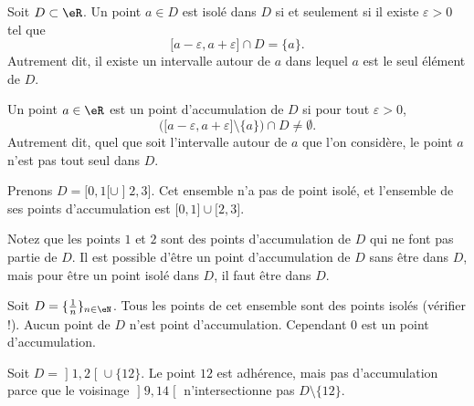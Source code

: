 \begin{lemma}
    Soit $D\subset\eR$. Un point $a\in D$ est isolé dans $D$ si et seulement si il existe $\varepsilon>0$ tel que
    \begin{equation}
        \mathopen[ a-\varepsilon , a+\varepsilon \mathclose]\cap D=\{ a \}.
    \end{equation}
    Autrement dit, il existe un intervalle autour de $a$ dans lequel $a$ est le seul élément de $D$.
\end{lemma}

\begin{lemma}
    Un point $a\in \eR$ est un point d'accumulation de $D$ si pour tout $\varepsilon>0$,
    \begin{equation}
        \Big( \mathopen[ a-\varepsilon , a+\varepsilon \mathclose]\setminus\{ a \} \Big)\cap D\neq\emptyset.
    \end{equation}
    Autrement dit, quel que soit l'intervalle autour de  $a$ que l'on considère, le point $a$ n'est pas tout seul dans $D$.
\end{lemma}

\begin{example}
	Prenons $D=\mathopen[ 0 , 1 [\cup\mathopen] 2 , 3 \mathclose]$. Cet ensemble n'a pas de point isolé, et l'ensemble de ses points d'accumulation est $\mathopen[ 0 , 1 \mathclose]\cup\mathopen[ 2,3  \mathclose]$.

	Notez que les points $1$ et $2$ sont des points d'accumulation de $D$ qui ne font pas partie de $D$. Il est possible d'être un point d'accumulation de $D$ sans être dans $D$, mais pour être un point isolé dans $D$, il faut être dans $D$.
\end{example}

\begin{example}
	Soit $D=\{ \frac{1}{ n }\}_{n\in\eN}$. Tous les points de cet ensemble sont des points isolés (vérifier !).  Aucun point de $D$ n'est point d'accumulation. Cependant $0$ est un point d'accumulation.
\end{example}

\begin{example}     \label{EXooWOYQooJolaTV}
    Soit \( D=\mathopen] 1 , 2 \mathclose[\cup\{ 12 \}\). Le point \( 12\) est adhérence, mais pas d'accumulation parce que le voisinage \( \mathopen] 9 , 14 \mathclose[\) n'intersectionne pas \( D\setminus \{ 12 \}\).
\end{example}

